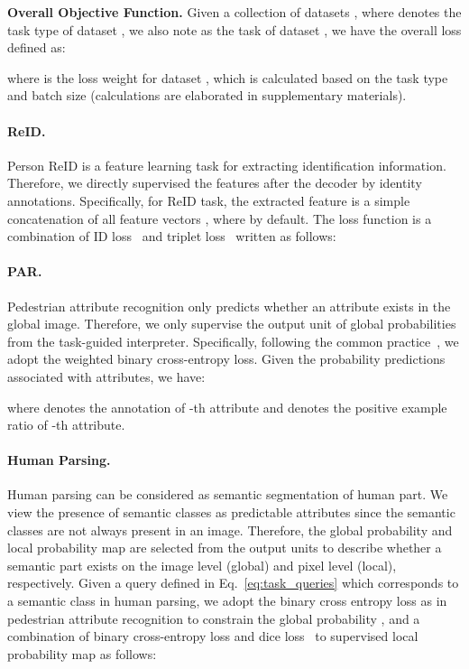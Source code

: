 \documentclass[10pt,twocolumn,letterpaper]{article}
\begin{document}
\noindent\textbf{Overall Objective Function.}
Given a collection of datasets , where  denotes the task type of dataset , we also note  as the task of dataset , we have the overall loss defined as:

where  is the loss weight for dataset , which is calculated based on the task type and batch size (calculations are elaborated in supplementary materials).

\paragraph{ReID.}
Person ReID is a feature learning task for extracting identification information. Therefore, we directly supervised the features after the decoder by identity annotations. Specifically, for ReID task, the extracted feature is a simple concatenation of all feature vectors , where  by default. The loss function is a combination of ID loss~\cite{zheng2017discriminatively} and triplet loss~\cite{liu2017end} written as follows:





\paragraph{PAR.}
Pedestrian attribute recognition only predicts whether an attribute exists in the global image. Therefore, we only supervise the output unit of global probabilities  from the task-guided interpreter. Specifically, following the common practice~\cite{tang2019improving,li2022label2label}, we adopt the weighted binary cross-entropy loss. Given the probability predictions  associated with  attributes, we have:

where  denotes the annotation of -th attribute and  denotes the positive example ratio of -th attribute. 

\paragraph{Human Parsing.}
Human parsing can be considered as semantic segmentation of human part. We view the presence of semantic classes as predictable attributes since the semantic classes are not always present in an image. Therefore, the global probability  and local probability map  are selected from the output units to describe whether a semantic part exists on the image level (global) and pixel level (local), respectively. Given a query  defined in Eq.~\ref{eq:task_queries} which corresponds to a semantic class in human parsing, we adopt the binary cross entropy loss as  in pedestrian attribute recognition to constrain the global probability , and a combination of binary cross-entropy loss and dice loss~\cite{cheng2022masked} to supervised local probability map  as follows:
\end{document}
